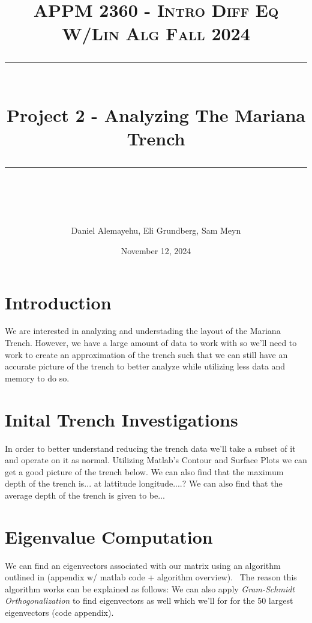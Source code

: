 \documentclass[letterpaper,12pt]{article}
\title{
\normalfont \normalsize 
\textsc{APPM 2360 - Intro Diff Eq W/Lin Alg \hfill Fall 2024} \\
[10pt] 
\rule{\linewidth}{0.5pt} \\[6pt] 
\huge Project 2 - Analyzing The Mariana Trench \\
\rule{\linewidth}{2pt}  \\[10pt]
}
\date{November 12, 2024}
\author{Daniel Alemayehu, Eli Grundberg, Sam Meyn}
\begin{document}
\begin{titlingpage}
\maketitle
\end{titlingpage}
\newpage
\tableofcontents
\newpage
\section{Introduction}
We are interested in analyzing and understading the layout of the Mariana Trench. 
However, we have a large amount of data to work with so we'll need to work to create an approximation of the trench such that we can still have an accurate picture of the trench to better analyze while utilizing less data and memory to do so. 
\section{Inital Trench Investigations}
In order to better understand reducing the trench data we'll take a subset of it and operate on it as normal.
Utilizing Matlab's Contour and Surface Plots we can get a good picture of the trench below.
We can also find that the maximum depth of the trench is... at lattitude longitude....?
We can also find that the average depth of the trench is given to be...
\section{Eigenvalue Computation}
We can find an eigenvectors associated with our matrix using an algorithm outlined in (appendix w/ matlab code + algorithm overview). \
The reason this algorithm works can be explained as follows:
We can also apply \textit{Gram-Schmidt Orthogonalization} to find eigenvectors as well which we'll for for the 50 largest eigenvectors (code appendix).
\end{document}
